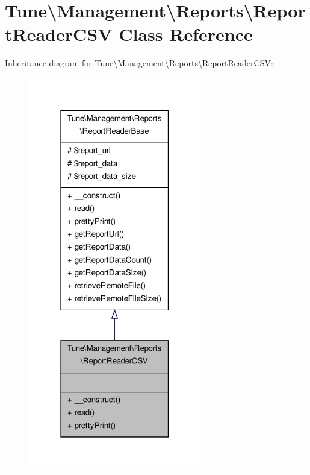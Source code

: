 \hypertarget{classTune_1_1Management_1_1Reports_1_1ReportReaderCSV}{\section{Tune\textbackslash{}Management\textbackslash{}Reports\textbackslash{}Report\-Reader\-C\-S\-V Class Reference}
\label{classTune_1_1Management_1_1Reports_1_1ReportReaderCSV}
}


Inheritance diagram for Tune\textbackslash{}Management\textbackslash{}Reports\textbackslash{}Report\-Reader\-C\-S\-V\-:
\nopagebreak
\begin{figure}[H]
\begin{center}
\leavevmode
\includegraphics[width=214pt]{classTune_1_1Management_1_1Reports_1_1ReportReaderCSV__inherit__graph}
\end{center}
\end{figure}


